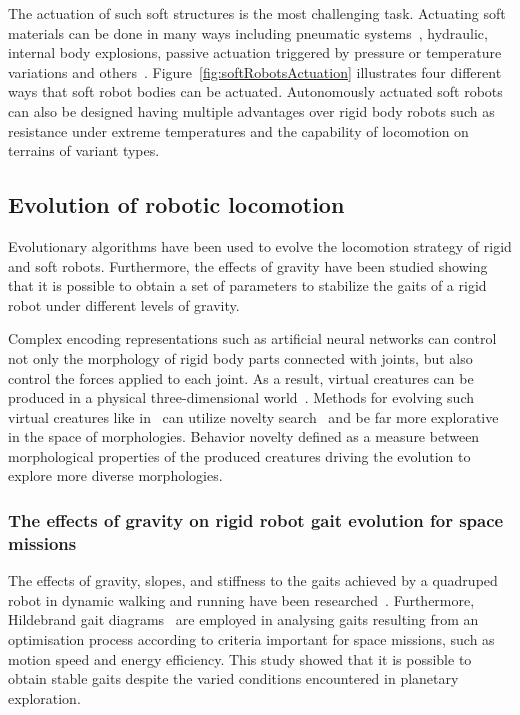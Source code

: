 \documentclass{sig-alternate}
\begin{document}
The actuation of such soft structures is the most challenging task. Actuating soft materials can be done in many ways including pneumatic systems~\cite{ilievski2011soft, shepherd2011multigait}, hydraulic, internal body explosions, passive actuation triggered by pressure or temperature variations and others~\cite{laschi2012soft, seok2010peristaltic}. Figure~\ref{fig:softRobotsActuation} illustrates four different ways that soft robot bodies can be actuated. Autonomously actuated soft robots~\cite{tolleyresilient} can also be designed having multiple advantages over rigid body robots such as resistance under extreme temperatures and the capability of locomotion on terrains of variant types.

\subsection{Evolution of robotic locomotion}

Evolutionary algorithms have been used to evolve the locomotion strategy of rigid and soft robots. Furthermore, the effects of gravity have been studied showing that it is possible to obtain a set of parameters to stabilize the gaits of a rigid robot under different levels of gravity.

Complex encoding representations such as artificial neural networks can control not only the morphology of rigid body parts connected with joints, but also control the forces applied to each joint. As a result, virtual creatures can be produced in a physical three-dimensional world~\cite{sims1994evolving}. Methods for evolving such virtual creatures like in~\cite{sims1994evolving} can utilize novelty search~\cite{lehman2011evolving} and be far more explorative in the space of morphologies. Behavior novelty defined as a measure between morphological properties of the produced creatures driving the evolution to explore more diverse morphologies.

\subsubsection*{The effects of gravity on rigid robot gait evolution for space missions}

The effects of gravity, slopes, and stiffness to the gaits achieved by a quadruped robot in dynamic walking and running have been researched~\cite{papadopoulos2013ariadna, kontolatisquadruped}. Furthermore, Hildebrand gait diagrams~\cite{hildebrand1989quadrupedal} are employed in analysing gaits resulting from an optimisation process according to criteria important for space missions, such as motion speed and energy efficiency. This study showed that it is possible to obtain stable gaits despite the varied conditions encountered in planetary exploration.
\end{document}

